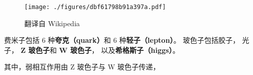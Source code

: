 
\begin{issues}
\issueDraft
\end{issues}

\begin{figure}[ht]
\centering
\texttt{[image: ./figures/dbf61798b91a397a.pdf]}
\caption{翻译自 Wikipedia} \label{fig_BasPar_2}
\end{figure}

费米子包括 6 种\textbf{夸克（quark）}和 6 种\textbf{轻子（lepton）}。 玻色子包括胶子， 光子， \textbf{Z 玻色子}和 \textbf{W 玻色子}， 以及\textbf{希格斯子（higgs）}。

其中，弱相互作用由 Z 玻色子与 W 玻色子传递，